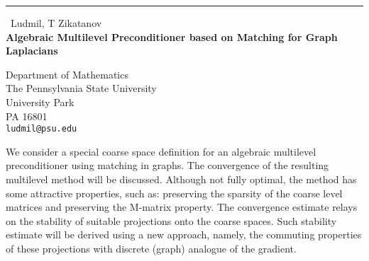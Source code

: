 \documentclass{report}
\begin{document}
\begin{center}
\rule{6in}{1pt} \
{\large Ludmil, T Zikatanov \\
{\bf Algebraic Multilevel Preconditioner based on Matching for Graph Laplacians}}

Department of Mathematics \\ The Pennsylvania State University \\ University Park \\ PA 16801
\\
{\tt ludmil@psu.edu}\end{center}

We consider a special coarse space definition for an algebraic
multilevel preconditioner using matching in graphs. The convergence of
the resulting multilevel method will be discussed. Although not fully
optimal, the method has some attractive properties, such as:
preserving the sparsity of the coarse level matrices and preserving
the M-matrix property. The convergence estimate relays on the
stability of suitable projections onto the coarse spaces. Such
stability estimate will be derived using a new approach, namely, the
commuting properties of these projections with discrete (graph) analogue of the gradient.
\end{document}
